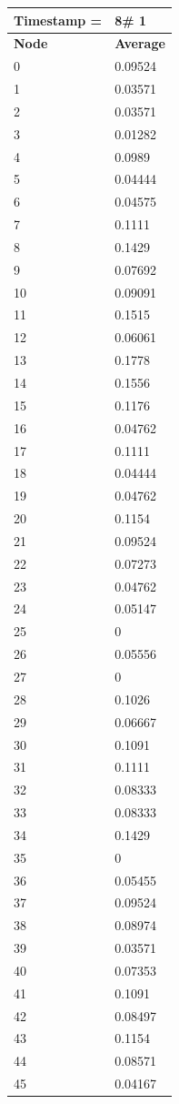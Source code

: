 \begin{tabular}{|l||l|}
\hline
\textbf{Timestamp =} & \textbf{8}\# 1\\\hline
	\textbf{Node} & \textbf{Average} \\ \hline
\hline
	0 & 0.09524 \\ \hline
	1 & 0.03571 \\ \hline
	2 & 0.03571 \\ \hline
	3 & 0.01282 \\ \hline
	4 & 0.0989 \\ \hline
	5 & 0.04444 \\ \hline
	6 & 0.04575 \\ \hline
	7 & 0.1111 \\ \hline
	8 & 0.1429 \\ \hline
	9 & 0.07692 \\ \hline
	10 & 0.09091 \\ \hline
	11 & 0.1515 \\ \hline
	12 & 0.06061 \\ \hline
	13 & 0.1778 \\ \hline
	14 & 0.1556 \\ \hline
	15 & 0.1176 \\ \hline
	16 & 0.04762 \\ \hline
	17 & 0.1111 \\ \hline
	18 & 0.04444 \\ \hline
	19 & 0.04762 \\ \hline
	20 & 0.1154 \\ \hline
	21 & 0.09524 \\ \hline
	22 & 0.07273 \\ \hline
	23 & 0.04762 \\ \hline
	24 & 0.05147 \\ \hline
	25 & 0 \\ \hline
	26 & 0.05556 \\ \hline
	27 & 0 \\ \hline
	28 & 0.1026 \\ \hline
	29 & 0.06667 \\ \hline
	30 & 0.1091 \\ \hline
	31 & 0.1111 \\ \hline
	32 & 0.08333 \\ \hline
	33 & 0.08333 \\ \hline
	34 & 0.1429 \\ \hline
	35 & 0 \\ \hline
	36 & 0.05455 \\ \hline
	37 & 0.09524 \\ \hline
	38 & 0.08974 \\ \hline
	39 & 0.03571 \\ \hline
	40 & 0.07353 \\ \hline
	41 & 0.1091 \\ \hline
	42 & 0.08497 \\ \hline
	43 & 0.1154 \\ \hline
	44 & 0.08571 \\ \hline
	45 & 0.04167 \\ \hline
\end{tabular}
